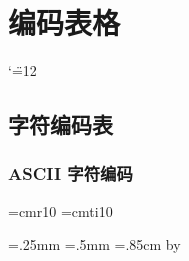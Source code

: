 \documentclass[openany]{book}
\begin{document}
%
\chapter{编码表格}

\catcode`\"=12

\newpage

\section{字符编码表}
\label{sec:asciitable}
\subsection{ASCII 字符编码}

\def\titlefont{\SansSerif \pointSize:10 \Style:roman }
\def\titlefont{\sffamily}
\def\bitfont{\SerifFont \pointSize:7 \Style:Roman }
\def\bitfont{\sffamily\small}
\def\codefont{\SansSerif \pointSize:5 \Style:roman }
\def\codefont{\sffamily\tiny}
\def\namefont{\SansSerif \pointSize:11 \Style:roman }
\let\namefont\relax
\let\commentfont\titlefont
\font\cmtenrm=cmr10 \font\cmtenit=cmti10

\newdimen\thinlinewidth \thinlinewidth=.25mm
\newdimen\fatlinewidth \fatlinewidth=.5mm
\newdimen\rowheight \rowheight=.85cm %
\newdimen\colwidth  \colwidth=1.2cm %
\newdimen\Colwidth {}\colwidth
  \advance\Colwidth by \thinlinewidth
\newdimen\topwhite \topwhite=2pt
\newdimen\botwhite \botwhite=3pt
\newdimen\leftwhite \leftwhite=0pt %
\newdimen\rightwhite \rightwhite=1pt %
\newcount\rowcount 
\newcount\colcount 
{} %
\newcount\thenumber
\end{document}
